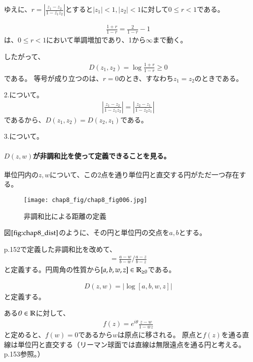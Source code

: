 ゆえに、$r=\left|\frac{z_1-z_2}{1-\overline{z_1}z_2}\right|$とすると$|z_1|<1, |z_2|<1$に対して$0\le r<1$である。

\begin{align*}
    \frac{1+r}{1-r}
    =\frac{2}{1-r}-1
\end{align*}
は、$0\le r<1$において単調増加であり、1から$\infty$まで動く。

したがって、
\begin{align*}
    D(z_1,z_2)=\log\frac{1+r}{1-r}\ge0
\end{align*}
である。
等号が成り立つのは、$r=0$のとき、すなわち$z_1=z_2$のときである。

2.について。
\begin{align*}
    \left|\frac{z_1-z_2}{1-\overline{z_1}z_2}\right|
    =\left|\frac{z_2-z_1}{1-\overline{z_2}z_1}\right|
\end{align*}
であるから、$D(z_1,z_2)=D(z_2,z_1)$である。

\newpage
3.について。

\paragraph{$D(z,w)$が非調和比を使って定義できることを見る。}

単位円内の$z,w$について、この2点を通り単位円と直交する円がただ一つ存在する。

\begin{figure}[h]
    \centering
    \texttt{[image: chap8\_fig/chap8\_fig006.jpg]}
    \caption{非調和比による距離の定義}
    \label{fig:chap8_dist}
\end{figure}

図$\ref{fig:chap8_dist}$のように、その円と単位円の交点を$a,b$とする。

p.152で定義した非調和比を改めて、
\begin{align*}
    [a,b,w,z]=\frac{a-w}{b-w}\Bigg/\frac{a-z}{b-z}
\end{align*}
と定義する。円周角の性質から$[a,b,w,z]\in\mathbb{R}_{\ge0}$である。

\begin{align*}
    D(z,w)=\left|\log[a,b,w,z]\right|
\end{align*}
と定義する。

ある$\theta\in\mathbb{R}$に対して、
\begin{align*}
    f(z)=e^{i\theta}\frac{z-w}{1-\overline{w}z}
\end{align*}
と定めると、$f(w)=0$であるから$w$は原点に移される。
原点と$f(z)$を通る直線は単位円と直交する（リーマン球面では直線は無限遠点を通る円と考える。p.153参照。）

